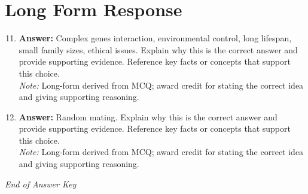 \documentclass[12pt]{article}
\begin{document}
\section*{Long Form Response}
\begin{enumerate}[label=\arabic*.]
\setcounter{enumi}{10}
\item \textbf{Answer:} Complex genes interaction, environmental control, long lifespan, small family sizes, ethical issues. Explain why this is the correct answer and provide supporting evidence. Reference key facts or concepts that support this choice.
\\ \textit{Note:} Long-form derived from MCQ; award credit for stating the correct idea and giving supporting reasoning.
\item \textbf{Answer:} Random mating. Explain why this is the correct answer and provide supporting evidence. Reference key facts or concepts that support this choice.
\\ \textit{Note:} Long-form derived from MCQ; award credit for stating the correct idea and giving supporting reasoning.
\end{enumerate}

\vfill
\noindent\textit{End of Answer Key}
\end{document}
